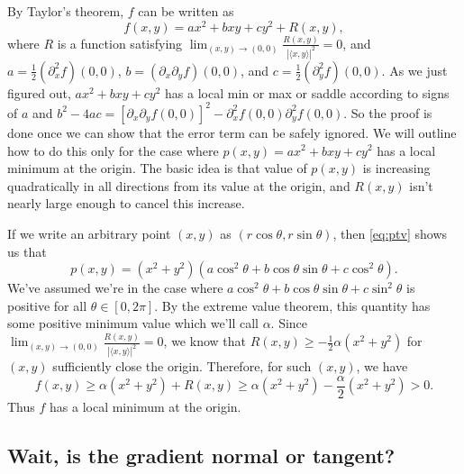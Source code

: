 \documentclass{watsonbook}
\begin{document}
\begin{pf}
  By Taylor's theorem, $f$ can be written as
  \[
    f(x,y) = ax^2 + bxy + cy^2 + R(x,y), 
  \]
  where $R$ is a function satisfying
  $\lim_{(x,y) \to (0,0)}\frac{R(x,y)}{|\langle x,y \rangle|^2} = 0$,
  and $a = \tfrac{1}{2}(\partial_x^2f)(0,0)$,
  $b = (\partial_x\partial_y f)(0,0)$, and
  $c = \tfrac{1}{2}(\partial_y^2f)(0,0)$. As we just figured out,
  $ax^2 + bxy + cy^2$ has a local min or max or saddle according to
  signs of $a$ and
  $b^2 - 4ac = [\partial_x\partial_y f(0,0)]^2 -
  \partial_x^2f(0,0)\partial_y^2 f(0,0)$. So the proof is done once we
  can show that the error term can be safely ignored. We will outline
  how to do this only for the case where $p(x,y) = ax^2 + bxy + cy^2$
  has a local minimum at the origin. The basic idea is that value of
  $p(x,y)$ is increasing quadratically in all directions from its
  value at the origin, and $R(x,y)$ isn't nearly large enough to
  cancel this increase.

  If we write an arbitrary point $(x,y)$ as
  $(r\cos \theta, r\sin \theta)$, then \eqref{eq:ptv} shows us that
  \[
    p(x,y) = (x^2+y^2)(a\cos^2 \theta + b \cos \theta \sin \theta +
    c \cos^2 \theta). 
  \]
  We've assumed we're in the case where
  $a\cos^2 \theta + b \cos \theta \sin \theta + c \sin^2 \theta$ is
  positive for all $\theta \in [0,2\pi]$. By the extreme value
  theorem, this quantity has some positive minimum value which we'll
  call $\alpha$.  Since
  $\lim_{(x,y) \to (0,0)}\frac{R(x,y)}{|\langle x,y \rangle|^2} = 0$, we
  know that $R(x,y) \geq -\tfrac{1}{2}\alpha(x^2+y^2)$ for $(x,y)$
  sufficiently close the origin. Therefore, for such $(x,y)$, we have
  \[
    f(x,y)  \geq \alpha(x^2 + y^2) + R(x,y) \geq
    \alpha(x^2 + y^2) - \frac{\alpha}{2}(x^2+y^2) > 0.
  \]
  Thus $f$ has a local minimum at the origin. 
\end{pf}

\newpage

\subsection{Wait, is the gradient normal or
  tangent?} \label{sec:gradienta}
\end{document}
